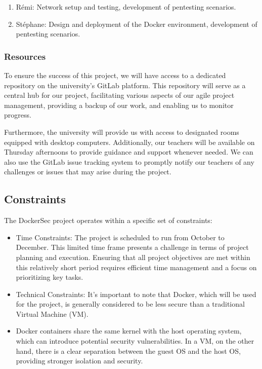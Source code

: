 \documentclass[a4paper,11pt,singlespacing]{article}
\begin{document}
\begin{enumerate}
    \item Rémi: Network setup and testing, development of pentesting scenarios.
    \item Stéphane: Design and deployment of the Docker environment, development of pentesting scenarios.
\end{enumerate}

\subsubsection{Resources}
To ensure the success of this project, we will have access to a dedicated repository on the university's GitLab platform. This repository will serve as a central hub for our project, facilitating various aspects of our agile project management, providing a backup of our work, and enabling us to monitor progress.\par
Furthermore, the university will provide us with access to designated rooms equipped with desktop computers. Additionally, our teachers will be available on Thursday afternoons to provide guidance and support whenever needed. We can also use the GitLab issue tracking system to promptly notify our teachers of any challenges or issues that may arise during the project.\par

\subsection{Constraints}
The DockerSec project operates within a specific set of constraints:
\begin{itemize}
    \item Time Constraints: The project is scheduled to run from October to December. This limited time frame presents a challenge in terms of project planning and execution. Ensuring that all project objectives are met within this relatively short period requires efficient time management and a focus on prioritizing key tasks.
    \item Technical Constraints: It's important to note that Docker, which will be used for the project, is generally considered to be less secure than a traditional Virtual Machine (VM).
    \item Docker containers share the same kernel with the host operating system, which can introduce potential security vulnerabilities. In a VM, on the other hand, there is a clear separation between the guest OS and the host OS, providing stronger isolation and security.
\end{itemize}
\end{document}
